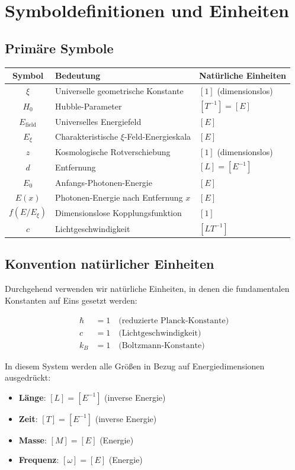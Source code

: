 \documentclass[12pt,a4paper]{article}
\begin{document}
	\section{Symboldefinitionen und Einheiten}
	
	\subsection{Primäre Symbole}
	
	\begin{longtable}{|c|l|l|}
		\hline
		\textbf{Symbol} & \textbf{Bedeutung} & \textbf{Natürliche Einheiten} \\
		\hline
		$\xi$ & Universelle geometrische Konstante & $[1]$ (dimensionslos) \\
		$H_0$ & Hubble-Parameter & $[T^{-1}] = [E]$ \\
		$E_{\text{field}}$ & Universelles Energiefeld & $[E]$ \\
		$E_\xi$ & Charakteristische $\xi$-Feld-Energieskala & $[E]$ \\
		$z$ & Kosmologische Rotverschiebung & $[1]$ (dimensionslos) \\
		$d$ & Entfernung & $[L] = [E^{-1}]$ \\
		$E_0$ & Anfangs-Photonen-Energie & $[E]$ \\
		$E(x)$ & Photonen-Energie nach Entfernung $x$ & $[E]$ \\
		$f(E/E_\xi)$ & Dimensionslose Kopplungsfunktion & $[1]$ \\
		$c$ & Lichtgeschwindigkeit & $[LT^{-1}]$ \\
		\hline
	\end{longtable}
	
	\subsection{Konvention natürlicher Einheiten}
	
	Durchgehend verwenden wir natürliche Einheiten, in denen die fundamentalen Konstanten auf Eins gesetzt werden:
	
	\begin{align}
		\hbar &= 1 \quad \text{(reduzierte Planck-Konstante)} \\
		c &= 1 \quad \text{(Lichtgeschwindigkeit)} \\
		k_B &= 1 \quad \text{(Boltzmann-Konstante)}
	\end{align}
	
	In diesem System werden alle Größen in Bezug auf Energiedimensionen ausgedrückt:
	\begin{itemize}
		\item \textbf{Länge}: $[L] = [E^{-1}]$ (inverse Energie)
		\item \textbf{Zeit}: $[T] = [E^{-1}]$ (inverse Energie)
		\item \textbf{Masse}: $[M] = [E]$ (Energie)
		\item \textbf{Frequenz}: $[\omega] = [E]$ (Energie)
	\end{itemize}
	
\end{document}
